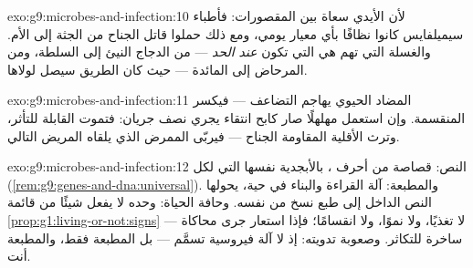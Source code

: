 \begin{solution}{exo:g9:microbes-and-infection:10}
لأن الأيدي سعاة بين المقصورات: فأطباء سيميلفايس كانوا
نظافًا بأي معيار يومي، ومع ذلك حملوا قاتل الجناح من
الجثة إلى الأم. والغسلة التي تهم هي التي تكون \emph{عند
الحد} --- من الدجاج النيئ إلى السلطة، ومن المرحاض إلى
المائدة --- حيث كان الطريق سيصل لولاها.
\end{solution}

\begin{solution}{exo:g9:microbes-and-infection:11}
المضاد الحيوي يهاجم التضاعف --- فيكسر 
المنقسمة. وإن استعمل مهلهلًا صار كابح انتقاء يجري نصف
جريان: فتموت القابلة للتأثر، وترث الأقلية المقاومة
الجناح --- فيربّى الممرض الذي يلقاه المريض التالي.
\end{solution}

\begin{solution}{exo:g9:microbes-and-infection:12}
النص: قصاصة من أحرف ، بالأبجدية نفسها التي لكل
 (\cref{rem:g9:genes-and-dna:universal}). والمطبعة:
آلة القراءة والبناء في  حية، يحولها النص الداخل إلى
طبع نسخ من نفسه. وحافة الحياة:  وحده لا يفعل
شيئًا من قائمة \cref{prop:g1:living-or-not:signs} ---
لا تغذيًا، ولا نموًا، ولا انقسامًا؛ فإذا استعار جرى
محاكاة ساخرة للتكاثر. وصعوبة تدويته: إذ لا آلة فيروسية
تسمَّم --- بل المطبعة فقط، والمطبعة أنت.
\end{solution}


